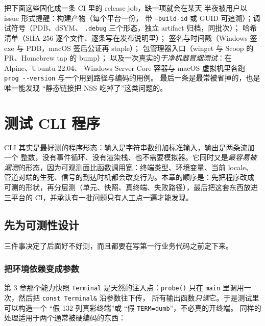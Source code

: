 \documentclass[12pt,a4paper,fontset=fandol]{ctexbook}
\newcommand{\Fn}[1]{\texttt{#1()}}
\newcommand{\Tp}[1]{\texttt{#1}}
\begin{document}
\begin{bestpractice}[title={发布流水线的最小闭环}]
把下面这些固化成一条 CI 里的 release job，缺一项就会在某天
半夜被用户以 issue 形式提醒：构建产物（每个平台一份，
带 \Tp{--build-id} 或 GUID 可追溯）；调试符号（PDB、dSYM、
\Tp{.debug} 三个形态，独立 artifact 归档，同批次）；
哈希清单（SHA-256 逐个文件、逐条写在发布说明里）；
签名与时间戳（Windows 签 exe 与 PDB，macOS 签后公证再 staple）；
包管理器入口（winget 与 Scoop 的 PR、Homebrew tap 的 bump）；
以及一次真实的\emph{干净机器冒烟测试}：在 Alpine、Ubuntu 22.04、
Windows Server Core 容器与 macOS 虚拟机里各跑
\lstinline|prog --version| 与一个用到路径与编码的用例。
最后一条是最常被省掉的，也是唯一能发现
``静态链接把 NSS 吃掉了''这类问题的。
\end{bestpractice}

\chapter{测试 CLI 程序}

CLI 其实是最好测的程序形态：输入是字符串数组加标准输入，输出是两条流加一个
整数，没有事件循环、没有渲染栈、也不需要模拟器。它同时又是\emph{最容易被
漏测}的形态，因为可观测面比函数调用宽：终端类型、环境变量、当前 locale、
管道对端的生死、信号的到达时机都会改变行为。本章的顺序是：先把程序改成
可测的形状，再分层测（单元、快照、真终端、失败路径），最后把这套东西放进
三平台的 CI，并承认有一批问题只有人工点一遍才能发现。

\section{先为可测性设计}

三件事决定了后面好不好测，而且都要在写第一行业务代码之前定下来。

\subsection{把环境依赖变成参数}

第 3 章那个能力快照 \Tp{Terminal} 是天然的注入点：\Fn{probe} 只在
\Tp{main} 里调用一次，然后把 \Tp{const Terminal\&} 沿参数往下传，
所有输出函数\emph{只读}它。于是测试里可以构造一个
``假 132 列真彩终端''或 ``假 \Tp{TERM=dumb}''，不必真的开终端。
同样的处理适用于两个通常被硬编码的东西：
\end{document}
